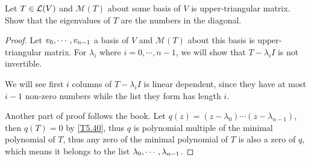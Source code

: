\documentclass[../main.tex]{subfiles}
\begin{document}
\begin{theorem}
  \label{T5.41}
  Let $T \in \mathcal{L}(V)$ and $\mathcal{M}(T)$ about some basis of $V$ is upper-triangular matrix.
  Show that the eigenvalues of $T$ are the numbers in the diagonal.
\end{theorem}
\begin{proof}
  Let $v_0 , \cdots , v_{n - 1}$ a basis of $V$ and $\mathcal{M}(T)$ about this basis is upper-triangular matrix.
  For $\lambda_i$ where $i = 0, \cdots, n - 1$, we will show that $T - \lambda_i I$ is
  not invertible.

  We will see first $i$ columns of $T - \lambda_i I$ is linear dependent,
  since they have at most $i - 1$ non-zero numbers while the list they form has length $i$.

  Another part of proof follows the book.
  Let $q(z) = (z - \lambda_0) \cdots (z - \lambda_{n - 1})$, then $q(T) = 0$
  by \ref{T5.40}, thus $q$ is polynomial multiple of the minimal polynomial of $T$,
  thus any zero of the minimal polynomial of $T$ is also a zero of $q$, which means
  it belongs to the list $\lambda_0 , \cdots , \lambda_{n - 1}$.
\end{proof}
\end{document}

